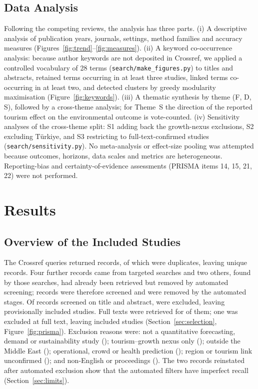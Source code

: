 \documentclass[11pt,a4paper]{article}
\begin{document}
\subsection{Data Analysis}
Following the competing reviews, the analysis has three parts. (i) A descriptive analysis of publication years, journals, settings, method families and accuracy measures (Figures~\ref{fig:trend}--\ref{fig:measures}). (ii) A keyword co-occurrence analysis: because author keywords are not deposited in Crossref, we applied a controlled vocabulary of 28 terms (\texttt{search/make\_figures.py}) to titles and abstracts, retained terms occurring in at least three studies, linked terms co-occurring in at least two, and detected clusters by greedy modularity maximisation (Figure~\ref{fig:keywords}). (iii) A thematic synthesis by theme (F, D, S), followed by a cross-theme analysis; for Theme~S the direction of the reported tourism effect on the environmental outcome is vote-counted. (iv) Sensitivity analyses of the cross-theme split: S1 adding back the growth-nexus exclusions, S2 excluding T\"urkiye, and S3 restricting to full-text-confirmed studies (\texttt{search/sensitivity.py}). No meta-analysis or effect-size pooling was attempted because outcomes, horizons, data scales and metrics are heterogeneous. Reporting-bias and certainty-of-evidence assessments (PRISMA items 14, 15, 21, 22) were not performed.

\section{Results}
\subsection{Overview of the Included Studies}
The \Nqueries{} Crossref queries returned \Nretrieved{} records, of which \Ndups{} were duplicates, leaving \Nunique{} unique records. Four further records came from targeted searches and two others, found by those searches, had already been retrieved but removed by automated screening; \Nscreened{} records were therefore screened and \Nautoexcl{} were removed by the automated stages. Of \Nassessed{} records screened on title and abstract, \Nexclelig{} were excluded, leaving \Nftsought{} provisionally included studies. Full texts were retrieved for \Nftretr{} of them; one was excluded at full text, leaving \Nincluded{} included studies (Section~\ref{sec:selection}, Figure~\ref{fig:prisma}). Exclusion reasons were: not a quantitative forecasting, demand or sustainability study (\Nenotq{}); tourism--growth nexus only (\Negrowth{}); outside the Middle East (\Negeo{}); operational, crowd or health prediction (\Neoper{}); region or tourism link unconfirmed (\Neundet{}); and non-English or proceedings (\Nelang{}). The two records reinstated after automated exclusion show that the automated filters have imperfect recall (Section~\ref{sec:limits}).
\end{document}
